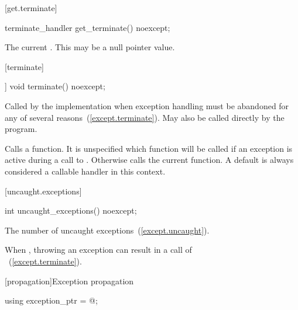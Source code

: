 [get.terminate]{}

\begin{itemdecl}
terminate_handler get_terminate() noexcept;
\end{itemdecl}

\begin{itemdescr}
\pnum
\returns The current .
\enternote This may be a null pointer value. \exitnote
\end{itemdescr}

[terminate]{}

%
\begin{itemdecl}
[[noreturn]] void terminate() noexcept;
\end{itemdecl}

\begin{itemdescr}
\pnum
\remarks
Called by the implementation when exception
handling must be abandoned for any of several reasons~(\ref{except.terminate}).
May also be called directly by the program.

\pnum
\effects
Calls a  function. It is unspecified which
 function will be called if an exception is active
during a call to .
Otherwise calls the current  function. \enternote A
default  is always considered a callable handler in
this context. \exitnote
\end{itemdescr}

[uncaught.exceptions]{}

%
\begin{itemdecl}
int uncaught_exceptions() noexcept;
\end{itemdecl}

\begin{itemdescr}
\pnum
\returns
The number of uncaught exceptions~(\ref{except.uncaught}).

\pnum
\remarks
When ,
throwing an exception can result in a call of\\
~(\ref{except.terminate}).
\end{itemdescr}

[propagation]{Exception propagation}

\begin{itemdecl}
using exception_ptr = @\unspec@;
\end{itemdecl}

